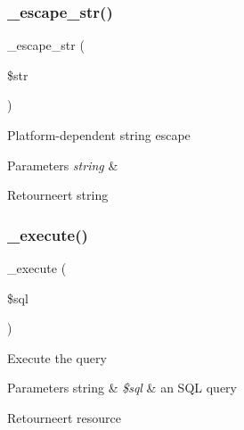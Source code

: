 \subsubsection{\texorpdfstring{\_escape\_str()}{\_escape\_str()}}
{\footnotesize\ttfamily \+\_\+escape\+\_\+str (\begin{DoxyParamCaption}\item[{}]{\$str }\end{DoxyParamCaption})\hspace{0.3cm}{\ttfamily [protected]}}

Platform-\/dependent string escape


\begin{DoxyParams}{Parameters}
{\em string} & \\
\hline
\end{DoxyParams}
\begin{DoxyReturn}{Retourneert}
string 
\end{DoxyReturn}
\mbox{\label{class_c_i___d_b__cubrid__driver_a114ab675d89bf8324a41785fb475e86d}} 
\subsubsection{\texorpdfstring{\_execute()}{\_execute()}}
{\footnotesize\ttfamily \+\_\+execute (\begin{DoxyParamCaption}\item[{}]{\$sql }\end{DoxyParamCaption})\hspace{0.3cm}{\ttfamily [protected]}}

Execute the query


\begin{DoxyParams}[1]{Parameters}
string & {\em \$sql} & an S\+QL query \\
\hline
\end{DoxyParams}
\begin{DoxyReturn}{Retourneert}
resource 
\end{DoxyReturn}
\mbox{\label{class_c_i___d_b__cubrid__driver_aef43f7e3e7b71d337ff3724c5eb14f10}} 
